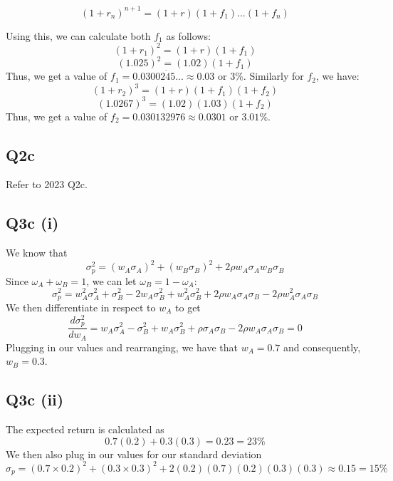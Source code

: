 \documentclass[a4paper]{article}[10pt]
\begin{document}
\begin{equation}
(1 + r_n)^{n+1} = (1+r)(1+f_1)...(1+f_n)
\end{equation}

Using this, we can calculate both $f_1$ as follows:
\begin{equation}
(1 + r_1)^2 = (1+r)(1+f_1)
\end{equation}
\begin{equation}
(1.025)^2 = (1.02)(1 + f_1)	
\end{equation}
Thus, we get a value of $f_1 = 0.03002\dot{4}5... \approx 0.03$ or $3\%$. Similarly for $f_2$, we have:
\begin{equation}
(1+r_2)^3 = (1+r)(1+f_1)(1+f_2)	
\end{equation}
\begin{equation}
(1.0267)^3 = (1.02)(1.03)(1+f_2)	
\end{equation}
Thus, we get a value of $f_2 = 0.030132976 \approx 0.0301$ or $3.01\%$.

\subsection*{Q2c}
Refer to 2023 Q2c.

\subsection*{Q3c (i)}
We know that
\begin{equation}
\sigma_p^2 = (w_A \sigma_A)^2 + (w_B \sigma_B)^2 + 2\rho w_A\sigma_A w_B\sigma_B
\end{equation}
Since $\omega_A + \omega_B = 1$, we can let $\omega_B = 1 - \omega_A$:
\begin{equation}
\sigma_p^2 = w_A^2\sigma_A^2 + \sigma_B^2 - 2w_A\sigma^2_B + w_A^2\sigma_B^2 + 2\rho w_A\sigma_A\sigma_B - 2\rho w_A^2\sigma_A\sigma_B	
\end{equation}
We then differentiate in respect to $w_A$ to get
\begin{equation}
\frac{d\sigma_p^2}{dw_A} = w_A\sigma_A^2 - \sigma_B^2 + w_A\sigma_B^2 + \rho \sigma_A\sigma_B - 2\rho w_A\sigma_A\sigma_B = 0	
\end{equation}
Plugging in our values and rearranging, we have that $w_A = 0.7$ and consequently, $w_B = 0.3$.

\subsection*{Q3c (ii)}
The expected return is calculated as
\begin{equation}
0.7(0.2) + 0.3(0.3) = 0.23 = 23\%	
\end{equation}
We then also plug in our values for our standard deviation
\begin{equation}
\sigma_p = (0.7 \times 0.2)^2 + (0.3 \times 0.3)^2 + 2(0.2)(0.7)(0.2)(0.3)(0.3) \approx 0.15 = 15\%
\end{equation}
\end{document}
